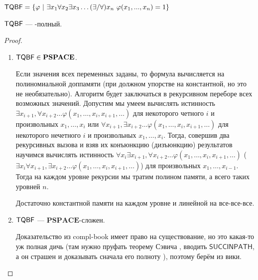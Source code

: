 \begin{definition}
    $\mathsf{TQBF} = \{ \varphi\ |\ \exists x_1 \forall x_2 \exists x_3 \ldots (\exists / \forall) x_n \ \varphi(x_1,...,x_n) = 1 \}$
\end{definition}

\begin{theorem}
    $\mathsf{TQBF}$ — \psp-полный.
\end{theorem}
\begin{proof}
\begin{enumerate}
    \item $\mathsf{TQBF} \in \textbf{PSPACE}$.
    
    Если значения всех переменных заданы, то формула вычисляется на полиномиальной доппамяти (при должном упорстве на константной, но это не необязательно). Алгоритм будет заключаться в рекурсивном переборе всех возможных значений. Допустим мы умеем вычислять истинность $\exists x_{i + 1}, \forall x_{i + 2}\ldots \varphi(x_1, \ldots, x_i, x_{i + 1}, \ldots)$ для некоторого четного $i$ и произвольных $x_1, \ldots, x_i$ или $\forall x_{i + 1}, \exists x_{i + 2}\ldots \varphi(x_1, \ldots, x_i, x_{i + 1}, \ldots)$ для некоторого нечетного $i$ и произвольных $x_1, \ldots, x_i$. Тогда, совершив два рекурсивных вызова и взяв их конъюнкцию (дизъюнкцию) результатов научимся вычислять истинность $\forall x_i \exists x_{i + 1}, \forall x_{i + 2}\ldots \varphi(x_1, \ldots, x_i, x_{i + 1}, \ldots)$ ($\exists x_i \forall x_{i + 1}, \exists x_{i + 2}\ldots \varphi(x_1, \ldots, x_i, x_{i + 1}, \ldots)$) для произвольных $x_1, \ldots, x_{i - 1}$. Тогда на каждом уровне рекурсии мы тратим полином памяти, а всего таких уровней $n$.
    
    \begin{lemmanote}
        Достаточно константной памяти на каждом уровне и линейной на все-все-все.
    \end{lemmanote}
    
    \item $\mathsf{TQBF}$ — $\mathbf{PSPACE}$-сложен. 
    
    \begin{lemmanote}
        Доказательство из compl-book имеет право на существование, но это какая-то уж полная дичь %
        (там нужно пруфать теорему Сэвича%
        , вводить $\mathsf{SUCCINPATH}$, а он страшен и доказывать сначала его полноту%
        ), поэтому берём из вики.


\end{lemmanote}
\end{enumerate}
\end{proof}
